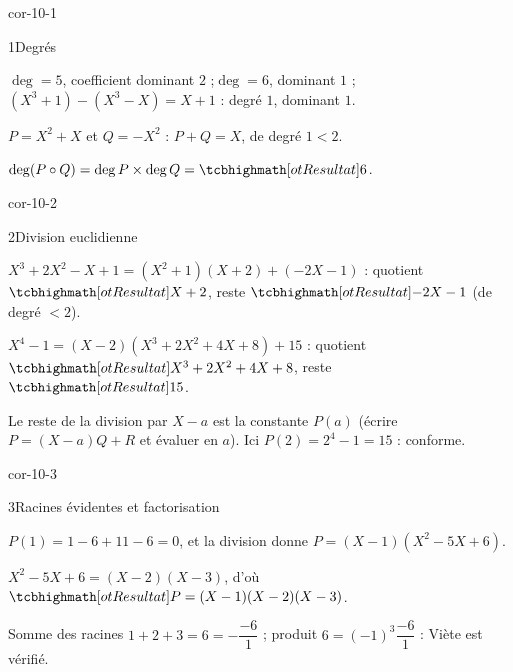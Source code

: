 
\corrigesSouples

\begin{blocLivre}{cor-10-1}
\begin{corrige}{1}{Degrés}
\begin{questions}
  \item $\deg=5$, coefficient dominant $2$ ;\quad $\deg=6$, dominant $1$ ;\quad
    $(X^{3}+1)-(X^{3}-X)=X+1$ : degré $1$, dominant $1$.
  \item $P=X^{2}+X$ et $Q=-X^{2}$ : $P+Q=X$, de degré $1<2$.
  \item $\deg(P\circ Q)=\deg P\times\deg Q=\res{6}$.
\end{questions}
\end{corrige}
\end{blocLivre}

\begin{blocLivre}{cor-10-2}
\begin{corrige}{2}{Division euclidienne}
\begin{questions}
  \item $X^{3}+2X^{2}-X+1=(X^{2}+1)(X+2)+(-2X-1)$ :
    quotient $\res{X+2}$, reste $\res{-2X-1}$ (de degré $<2$).
  \item $X^{4}-1=(X-2)(X^{3}+2X^{2}+4X+8)+15$ :
    quotient $\res{X^{3}+2X^{2}+4X+8}$, reste $\res{15}$.
  \item Le reste de la division par $X-a$ est la constante $P(a)$
    (écrire $P=(X-a)Q+R$ et évaluer en $a$). Ici
    $P(2)=2^{4}-1=15$ : conforme.
\end{questions}
\end{corrige}
\end{blocLivre}

\begin{blocLivre}{cor-10-3}
\begin{corrige}{3}{Racines évidentes et factorisation}
\begin{questions}
  \item $P(1)=1-6+11-6=0$, et la division donne
    $P=(X-1)(X^{2}-5X+6)$.
  \item $X^{2}-5X+6=(X-2)(X-3)$, d'où
    $\res{P=(X-1)(X-2)(X-3)}$.
  \item Somme des racines $1+2+3=6=-\dfrac{-6}{1}$ ; produit
    $6=(-1)^{3}\dfrac{-6}{1}$ : Viète est vérifié.
\end{questions}
\end{corrige}
\end{blocLivre}


